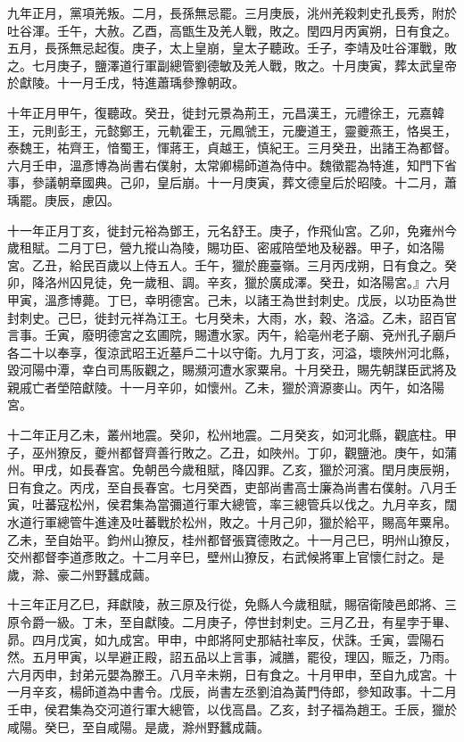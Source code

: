\begin{pinyinscope}
 九年正月，黨項羌叛。二月，長孫無忌罷。三月庚辰，洮州羌殺刺史孔長秀，附於吐谷渾。壬午，大赦。乙酉，高甑生及羌人戰，敗之。閏四月丙寅朔，日有食之。五月，長孫無忌起復。庚子，太上皇崩，皇太子聽政。壬子，李靖及吐谷渾戰，敗之。七月庚子，鹽澤道行軍副總管劉德敏及羌人戰，敗之。十月庚寅，葬太武皇帝於獻陵。十一月壬戌，特進蕭瑀參豫朝政。



 十年正月甲午，復聽政。癸丑，徙封元景為荊王，元昌漢王，元禮徐王，元嘉韓王，元則彭王，元懿鄭王，元軌霍王，元鳳虢王，元慶道王，靈夔燕王，恪吳王，泰魏王，祐齊王，愔蜀王，惲蔣王，貞越王，慎紀王。三月癸丑，出諸王為都督。六月壬申，溫彥博為尚書右僕射，太常卿楊師道為侍中。魏徵罷為特進，知門下省事，參議朝章國典。己卯，皇后崩。十一月庚寅，葬文德皇后於昭陵。十二月，蕭瑀罷。庚辰，慮囚。



 十一年正月丁亥，徙封元裕為鄧王，元名舒王。庚子，作飛仙宮。乙卯，免雍州今歲租賦。二月丁巳，營九摐山為陵，賜功臣、密戚陪塋地及秘器。甲子，如洛陽宮。乙丑，給民百歲以上侍五人。壬午，獵於鹿臺嶺。三月丙戌朔，日有食之。癸卯，降洛州囚見徒，免一歲租、調。辛亥，獵於廣成澤。癸丑，如洛陽宮。』六月甲寅，溫彥博薨。丁巳，幸明德宮。己未，以諸王為世封刺史。戊辰，以功臣為世封刺史。己巳，徙封元祥為江王。七月癸未，大雨，水，穀、洛溢。乙未，詔百官言事。壬寅，廢明德宮之玄圃院，賜遭水家。丙午，給亳州老子廟、兗州孔子廟戶各二十以奉享，復涼武昭王近墓戶二十以守衛。九月丁亥，河溢，壞陜州河北縣，毀河陽中潭，幸白司馬阪觀之，賜瀕河遭水家粟帛。十月癸丑，賜先朝謀臣武將及親戚亡者塋陪獻陵。十一月辛卯，如懷州。乙未，獵於濟源麥山。丙午，如洛陽宮。



 十二年正月乙未，叢州地震。癸卯，松州地震。二月癸亥，如河北縣，觀底柱。甲子，巫州獠反，夔州都督齊善行敗之。乙丑，如陜州。丁卯，觀鹽池。庚午，如蒲州。甲戌，如長春宮。免朝邑今歲租賦，降囚罪。乙亥，獵於河濱。閏月庚辰朔，日有食之。丙戌，至自長春宮。七月癸酉，吏部尚書高士廉為尚書右僕射。八月壬寅，吐蕃寇松州，侯君集為當彌道行軍大總管，率三總管兵以伐之。九月辛亥，闊水道行軍總管牛進達及吐蕃戰於松州，敗之。十月己卯，獵於給平，賜高年粟帛。乙未，至自始平。鈞州山獠反，桂州都督張寶德敗之。十一月己巳，明州山獠反，交州都督李道彥敗之。十二月辛巳，壁州山獠反，右武候將軍上官懷仁討之。是歲，滁、豪二州野蠶成繭。



 十三年正月乙巳，拜獻陵，赦三原及行從，免縣人今歲租賦，賜宿衛陵邑郎將、三原令爵一級。丁未，至自獻陵。二月庚子，停世封刺史。三月乙丑，有星孛于畢、昴。四月戊寅，如九成宮。甲申，中郎將阿史那結社率反，伏誅。壬寅，雲陽石然。五月甲寅，以旱避正殿，詔五品以上言事，減膳，罷役，理囚，賑乏，乃雨。六月丙申，封弟元嬰為滕王。八月辛未朔，日有食之。十月甲申，至自九成宮。十一月辛亥，楊師道為中書令。戊辰，尚書左丞劉洎為黃門侍郎，參知政事。十二月壬申，侯君集為交河道行軍大總管，以伐高昌。乙亥，封子福為趙王。壬辰，獵於咸陽。癸巳，至自咸陽。是歲，滁州野蠶成繭。




\end{pinyinscope}
